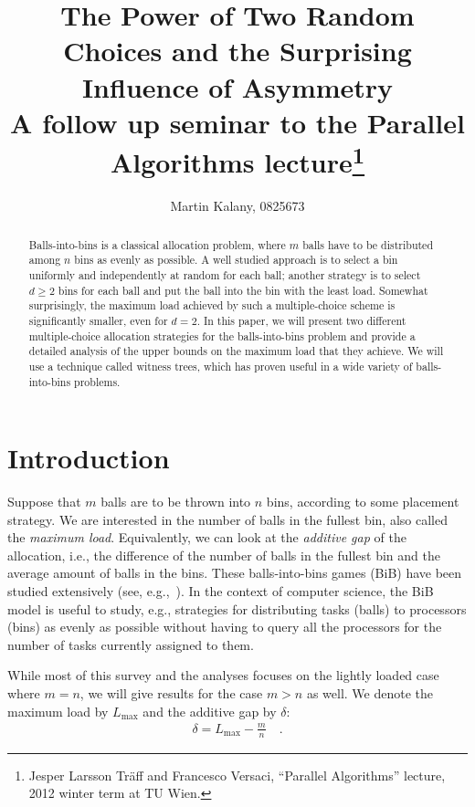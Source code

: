 \documentclass[a4paper,12pt]{article}
\newcommand\load{L_{\mathrm{max}}}
\begin{document}
\title{The Power of Two Random Choices and the Surprising Influence of Asymmetry\\ 
\normalsize A follow up seminar to the Parallel Algorithms lecture\footnote{Jesper Larsson Tr\"aff and Francesco Versaci, ``Parallel Algorithms'' lecture, 2012 winter term at TU Wien.}}
\author{Martin Kalany, 0825673}
\maketitle

\begin{abstract}
\noindent
Balls-into-bins is a classical allocation problem, where $m$ balls have to be distributed among $n$ bins as evenly as possible. A well studied approach is to select a bin uniformly and independently at random for each ball; another strategy is to select $d\geq 2$ bins for each ball and put the ball into the bin with the least load. Somewhat surprisingly, the maximum load achieved by such a multiple-choice scheme is significantly smaller, even for $d=2$. In this paper, we will present two different multiple-choice allocation strategies for the balls-into-bins problem and provide a detailed analysis of the upper bounds on the maximum load that they achieve. We will use a technique called witness trees, which has proven useful in a wide variety of balls-into-bins problems.
\end{abstract}

\section{Introduction}
\label{sec:intro}
Suppose that $m$ balls are to be thrown into $n$ bins, according to some placement strategy. We are interested in the number of balls in the fullest bin, also called the \emph{maximum load}. Equivalently, we can look at the \emph{additive gap} of the allocation, i.e., the difference of the number of balls in the fullest bin and the average amount of balls in the bins. These balls-into-bins games (BiB) have been studied extensively (see, e.g.,~\cite{JK77}). In the context of computer science, the BiB model is useful to study, e.g., strategies for distributing tasks (balls) to processors (bins) as evenly as possible without having to query all the processors for the number of tasks currently assigned to them.

While most of this survey and the analyses focuses on the lightly loaded case where $m=n$, we will give results for the case $m > n$ as well. We denote the maximum load by $\load$ and the additive gap by $\delta$:
\begin{align*}
\delta = \load - \frac{m}{n} \quad .
\end{align*}
\end{document}
